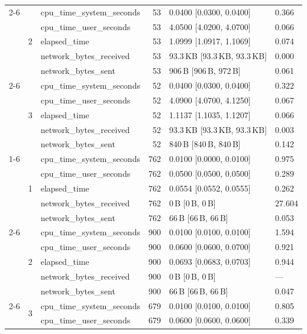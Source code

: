 \begin{tabular}{lllrll}
\cline{2-6}
 & \multirow[t]{5}{*}{2} & cpu_time_system_seconds & 53 & 0.0400 [0.0300, 0.0400] & 0.366 \\
 &  & cpu_time_user_seconds & 53 & 4.0500 [4.0200, 4.0700] & 0.066 \\
 &  & elapsed_time & 53 & 1.0999 [1.0917, 1.1069] & 0.074 \\
 &  & network_bytes_received & 53 & 93.3\,KB [93.3\,KB, 93.3\,KB] & 0.000 \\
 &  & network_bytes_sent & 53 & 906\,B [906\,B, 972\,B] & 0.061 \\
\cline{2-6}
 & \multirow[t]{5}{*}{3} & cpu_time_system_seconds & 52 & 0.0400 [0.0300, 0.0400] & 0.322 \\
 &  & cpu_time_user_seconds & 52 & 4.0900 [4.0700, 4.1250] & 0.067 \\
 &  & elapsed_time & 52 & 1.1137 [1.1035, 1.1207] & 0.066 \\
 &  & network_bytes_received & 52 & 93.3\,KB [93.3\,KB, 93.3\,KB] & 0.003 \\
 &  & network_bytes_sent & 52 & 840\,B [840\,B, 840\,B] & 0.142 \\
\cline{1-6} \cline{2-6}
\multirow[t]{15}{*}{bbox-filtering-local-small} & \multirow[t]{5}{*}{1} & cpu_time_system_seconds & 762 & 0.0100 [0.0000, 0.0100] & 0.975 \\
 &  & cpu_time_user_seconds & 762 & 0.0500 [0.0500, 0.0500] & 0.289 \\
 &  & elapsed_time & 762 & 0.0554 [0.0552, 0.0555] & 0.262 \\
 &  & network_bytes_received & 762 & 0\,B [0\,B, 0\,B] & 27.604 \\
 &  & network_bytes_sent & 762 & 66\,B [66\,B, 66\,B] & 0.053 \\
\cline{2-6}
 & \multirow[t]{5}{*}{2} & cpu_time_system_seconds & 900 & 0.0100 [0.0100, 0.0100] & 1.594 \\
 &  & cpu_time_user_seconds & 900 & 0.0600 [0.0600, 0.0700] & 0.921 \\
 &  & elapsed_time & 900 & 0.0693 [0.0683, 0.0703] & 0.944 \\
 &  & network_bytes_received & 900 & 0\,B [0\,B, 0\,B] & --- \\
 &  & network_bytes_sent & 900 & 66\,B [66\,B, 66\,B] & 0.047 \\
\cline{2-6}
 & \multirow[t]{5}{*}{3} & cpu_time_system_seconds & 679 & 0.0100 [0.0100, 0.0100] & 0.805 \\
 &  & cpu_time_user_seconds & 679 & 0.0600 [0.0600, 0.0600] & 0.339 \\

\end{tabular}
